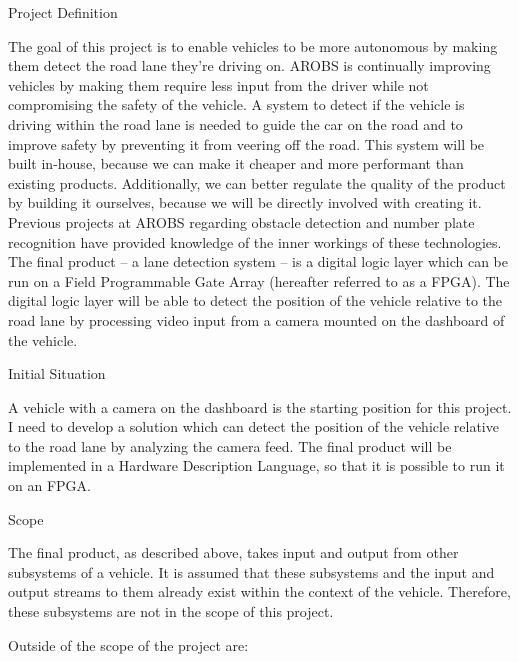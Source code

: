 \documentclass{matthijs}
\begin{document}
	\begin{hoofdstuk}{Project Definition}

		The goal of this project is to enable vehicles to be more autonomous by making them detect the road lane they're driving on.
		AROBS is continually improving vehicles by making them require less input from the driver while not compromising the safety of the vehicle.
		A system to detect if the vehicle is driving within the road lane is needed to guide the car on the road and to improve safety by preventing it from veering off the road.
		This system will be built in-house, because we can make it cheaper and more performant than existing products.
		Additionally, we can better regulate the quality of the product by building it ourselves, because we will be directly involved with creating it.
		Previous projects at AROBS regarding obstacle detection and number plate recognition have provided knowledge of the inner workings of these technologies.
		The final product -- a lane detection system -- is a digital logic layer which can be run on a Field Programmable Gate Array (hereafter referred to as a FPGA).
		The digital logic layer will be able to detect the position of the vehicle relative to the road lane by processing video input from a camera mounted on the dashboard of the vehicle.

		\begin{paragraaf}{Initial Situation}
			
			A vehicle with a camera on the dashboard is the starting position for this project.
			I need to develop a solution which can detect the position of the vehicle relative to the road lane by analyzing the camera feed.
			The final product will be implemented in a Hardware Description Language, so that it is possible to run it on an FPGA.
		
		\end{paragraaf}

		\begin{paragraaf}{Scope}

			The final product, as described above, takes input and output from other subsystems of a vehicle.
			It is assumed that these subsystems and the input and output streams to them already exist within the context of the vehicle.
			Therefore, these subsystems are not in the scope of this project.
			
			Outside of the scope of the project are:

			\begin{enumerate}
			

\end{enumerate}
\end{paragraaf}
\end{hoofdstuk}
\end{document}
